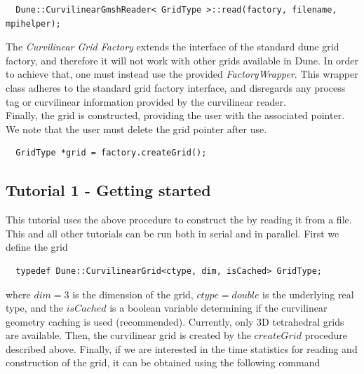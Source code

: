 \begin{mybox}
\begin{lstlisting}
  Dune::CurvilinearGmshReader< GridType >::read(factory, filename, mpihelper); 
\end{lstlisting}
\end{mybox}

\noindent
The \textit{Curvilinear Grid Factory} extends the interface of the standard dune grid factory, and therefore it will not work with other grids available in Dune. In order to achieve that, one must instead use the provided \textit{FactoryWrapper}. This wrapper class adheres to the standard grid factory interface, and disregards any process tag or curvilinear information provided by the curvilinear \gmsh{} reader. \\

\noindent
Finally, the grid is constructed, providing the user with the associated pointer. We note that the user must delete the grid pointer after use. %

\begin{mybox}
\begin{lstlisting}
  GridType *grid = factory.createGrid();
\end{lstlisting}
\end{mybox}

\subsection{Tutorial 1 - Getting started}
\label{usage-howto-tutorial-gettingstarted}

\noindent
This tutorial uses the above procedure to construct the \curvgrid{} by reading it from a \gmsh{} file. This and all other tutorials can be run both in serial and in parallel. First we define the grid

\begin{mybox}
\begin{lstlisting}
  typedef Dune::CurvilinearGrid<ctype, dim, isCached> GridType;
\end{lstlisting}
\end{mybox}

\noindent
where $dim=3$ is the dimension of the grid, $ctype=double$ is the underlying real type, and the $isCached$ is a boolean variable determining if the curvilinear geometry caching is used (recommended). Currently, only 3D tetrahedral grids are available. Then, the curvilinear grid is created by the $createGrid$ procedure described above. Finally, if we are interested in the time statistics for reading and construction of the grid, it can be obtained using the following command

